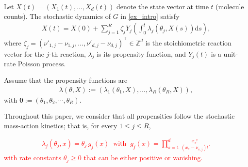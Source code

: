 \documentclass[pdflatex,sn-mathphys-num]{sn-jnl}%
\def\dd{\text{d}}
\theoremstyle{thmstyleone}%
\theoremstyle{thmstyletwo}%
\theoremstyle{thmstylethree}%
\begin{document}
Let $X(t) = (X_1 (t), \ldots, X_d (t))$ denote the state vector at time $t$ (molecule counts).
The stochastic dynamics of $G$ in \eqref{ex_intro} satisfy
\begin{align*}
X (t) = X (0) + \sum_{j=1}^{R} \zeta_j Y_j
\left( \int_{0}^t\lambda_j(\theta_j, X(s)) \dd s \right),
\end{align*}
where $\zeta_{j} = (\nu'_{1, j} - \nu_{1, j}, \ldots, \nu'_{d, j} - \nu_{d, j})^{\top} \in \mathbb{Z}^d$ is the stoichiometric reaction vector for the $j$-th reaction, $\lambda_j$ is its propensity function, and $Y_j(t)$ is a unit-rate Poisson process.

Assume that the propensity functions are
\begin{align*}
\lambda(\theta, X) := (\lambda_1( \theta_1, X), \ldots, \lambda_R (\theta_R, X)),
\end{align*}
with $\boldsymbol{\theta} := ( \theta_1,\theta_2,\cdots, \theta_R)$.

Throughout this paper, we consider that all propensities follow the stochastic mass-action kinetics; that is, for every $1 \leq j \leq R$,

\textcolor{red}{
\begin{align}
    \lambda_{j}(\theta_j, x) = \theta_j \,g_j(x)
\ \text{ with } \
g_j(x) = \prod_{s=1}^d   \frac{x_s!}{( x_s- \nu_{s,j}) ! }
.
\label{def:propensity-mass-action-kinetic}
\end{align}
with rate constants $\theta_j\geq 0$ that can be either positive or vanishing.
}
\end{document}
